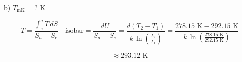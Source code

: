 b) $\bar{T}_{\text{mK}} = ? \text{ K}$

\[
\bar{T} = \frac{\int_{e}^{a} T \, dS}{S_a - S_e} \quad \text{isobar} = \frac{dU}{S_a - S_e} = \frac{d(T_2 - T_1)}{k \, \ln \left( \frac{T_2}{T_1} \right)} = \frac{278.15 \text{ K} - 292.15 \text{ K}}{k \, \ln \left( \frac{278.15 \text{ K}}{292.15 \text{ K}} \right)}
\]

\[
\approx 293.12 \text{ K}
\]